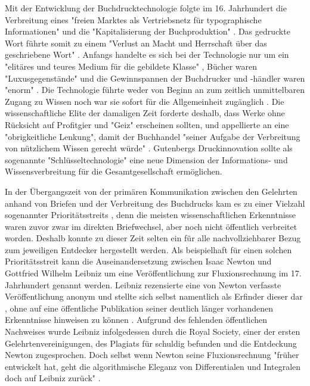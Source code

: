 Mit der Entwicklung der Buchdrucktechnologie folgte im 16. Jahrhundert die Verbreitung eines "freien Marktes als Vertriebsnetz für typographische Informationen"\cite{giesecke_1991_buchdruck} und die "Kapitalisierung der Buchproduktion" \cite{steiner_1998_autorenhonorar}. Das gedruckte Wort führte somit zu einem "Verlust an Macht und Herrschaft über das geschriebene Wort" \cite{wunderlich_2008_buchdruck}. Anfangs handelte es sich bei der Technologie nur um ein "elitäres und teures Medium für die gebildete Klasse" \cite{hartmann_2008_medien}, Bücher waren "Luxusgegenstände" und die Gewinnspannen der Buchdrucker und -händler waren "enorm" \cite{stober_2014_pressegeschichte}. Die Technologie führte weder von Beginn an zum zeitlich unmittelbaren Zugang zu Wissen noch war sie sofort für die Allgemeinheit zugänglich \cite{hartmann_2008_medien}. Die wissenschaftliche Elite der damaligen Zeit forderte deshalb, dass Werke ohne Rücksicht auf Profitgier und "Geiz" \cite{luther_1876} erscheinen sollten, und appellierte an eine "obrigkeitliche Lenkung", damit der Buchhandel "seiner Aufgabe der Verbreitung von nützlichem Wissen gerecht würde" \cite{wittmann_1999_geschichte}. Gutenbergs Druckinnovation sollte als sogenannte "Schlüsseltechnologie" \cite{jager_1993_theoretische} eine neue Dimension der Informations- und Wissensverbreitung für die Gesamtgesellschaft ermöglichen.

In der Übergangszeit von der primären Kommunikation zwischen den Gelehrten anhand von Briefen und der Verbreitung des Buchdrucks kam es zu einer Vielzahl sogenannter Prioritätsstreits \cite{schirmbacher_2009_wisspub}, denn die meisten wissenschaftlichen Erkenntnisse waren zuvor zwar im direkten Briefwechsel, aber noch nicht öffentlich verbreitet worden. Deshalb konnte zu dieser Zeit selten ein für alle nachvollziehbarer Bezug zum jeweiligen Entdecker hergestellt werden. Als beispielhaft für einen solchen Prioritätsstreit kann die Auseinandersetzung zwischen Isaac Newton und Gottfried Wilhelm Leibniz um eine Veröffentlichung zur Fluxionsrechnung im 17. Jahrhundert genannt werden. Leibniz rezensierte eine von Newton verfasste Veröffentlichung anonym und stellte sich selbst namentlich als Erfinder dieser dar \cite{2013_leibniz}, ohne auf eine öffentliche Publikation seiner deutlich länger vorhandenen Erkenntnisse hinweisen zu können \cite{schirmbacher_2009_wisspub}. Aufgrund des fehlenden öffentlichen Nachweises wurde Leibniz infolgedessen durch die Royal Society, einer der ersten Gelehrtenvereinigungen, des Plagiats für schuldig befunden und die Entdeckung Newton zugesprochen. Doch selbst wenn Newton seine Fluxionsrechnung "früher entwickelt hat, geht die algorithmische Eleganz von Differentialen und Integralen doch auf Leibniz zurück" \cite{kittler_faz_1996}.

